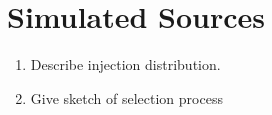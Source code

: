 \section{Simulated Sources}
\begin{enumerate}
\item Describe injection distribution.
\item Give sketch of selection process
\end{enumerate}